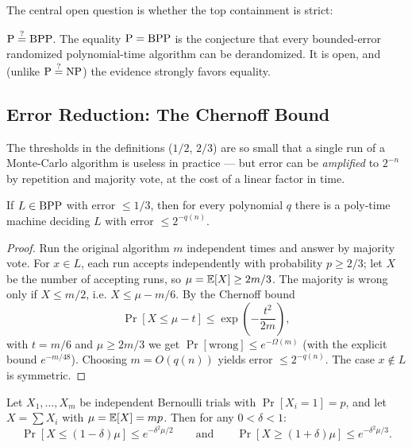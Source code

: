 The central open question is whether the top containment is strict:

\begin{conjecture}
$\text{P} \stackrel{?}{=} \text{BPP}$. The equality $\text{P} = \text{BPP}$ is the conjecture that every bounded-error randomized polynomial-time algorithm can be derandomized. It is open, and (unlike $\text{P} \stackrel{?}{=} \text{NP}$) the evidence strongly favors equality.
\end{conjecture}

\subsection{Error Reduction: The Chernoff Bound}
\label{sec:randomized:amplification}

The thresholds in the definitions ($1/2$, $2/3$) are so small that a single run of a Monte-Carlo algorithm is useless in practice --- but error can be \emph{amplified} to $2^{-n}$ by repetition and majority vote, at the cost of a linear factor in time.

\begin{theorem}
If $L \in \text{BPP}$ with error $\le 1/3$, then for every polynomial $q$ there is a poly-time machine deciding $L$ with error $\le 2^{-q(n)}$.
\end{theorem}

\begin{proof}
Run the original algorithm $m$ independent times and answer by majority vote. For $x \in L$, each run accepts independently with probability $p \ge 2/3$; let $X$ be the number of accepting runs, so $\mu = \mathbb{E}[X] \ge 2m/3$. The majority is wrong only if $X \le m/2$, i.e. $X \le \mu - m/6$. By the Chernoff bound
\[
\Pr[X \le \mu - t] \le \exp\left(-\frac{t^2}{2m}\right),
\]
with $t = m/6$ and $\mu \ge 2m/3$ we get $\Pr[\text{wrong}] \le e^{-\Omega(m)}$ (with the explicit bound $e^{-m/48}$). Choosing $m = O(q(n))$ yields error $\le 2^{-q(n)}$. The case $x \notin L$ is symmetric.
\end{proof}

\begin{theorem}
Let $X_1, \dots, X_m$ be independent Bernoulli trials with $\Pr[X_i = 1] = p$, and let $X = \sum X_i$ with $\mu = \mathbb{E}[X] = mp$. Then for any $0 < \delta < 1$:
\[
\Pr[X \le (1-\delta)\mu] \le e^{-\delta^2 \mu / 2}
\qquad\text{and}\qquad
\Pr[X \ge (1+\delta)\mu] \le e^{-\delta^2 \mu / 3}.
\]
\end{theorem}

